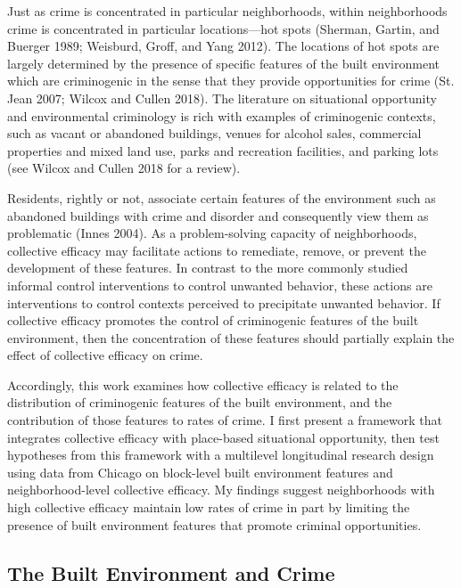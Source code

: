 \documentclass [11pt, proquest] {uwthesis}[2015/03/03]
\begin{document}
Just as crime is concentrated in particular neighborhoods, within neighborhoods crime is concentrated in particular locations---hot spots (Sherman, Gartin, and Buerger 1989; Weisburd, Groff, and Yang 2012). The locations of hot spots are largely determined by the presence of specific features of the built environment which are criminogenic in the sense that they provide opportunities for crime (St. Jean 2007; Wilcox and Cullen 2018). The literature on situational opportunity and environmental criminology is rich with examples of criminogenic contexts, such as vacant or abandoned buildings, venues for alcohol sales, commercial properties and mixed land use, parks and recreation facilities, and parking lots (see Wilcox and Cullen 2018 for a review).

Residents, rightly or not, associate certain features of the environment such as abandoned buildings with crime and disorder and consequently view them as problematic (Innes 2004). As a problem-solving capacity of neighborhoods, collective efficacy may facilitate actions to remediate, remove, or prevent the development of these features. In contrast to the more commonly studied informal control interventions to control unwanted behavior, these actions are interventions to control contexts perceived to precipitate unwanted behavior. If collective efficacy promotes the control of criminogenic features of the built environment, then the concentration of these features should partially explain the effect of collective efficacy on crime.

Accordingly, this work examines how collective efficacy is related to the distribution of criminogenic features of the built environment, and the contribution of those features to rates of crime. I first present a framework that integrates collective efficacy with place-based situational opportunity, then test hypotheses from this framework with a multilevel longitudinal research design using data from Chicago on block-level built environment features and neighborhood-level collective efficacy. My findings suggest neighborhoods with high collective efficacy maintain low rates of crime in part by limiting the presence of built environment features that promote criminal opportunities.

\hypertarget{the-built-environment-and-crime}{%
\subsection{The Built Environment and Crime}\label{the-built-environment-and-crime}}
\end{document}
